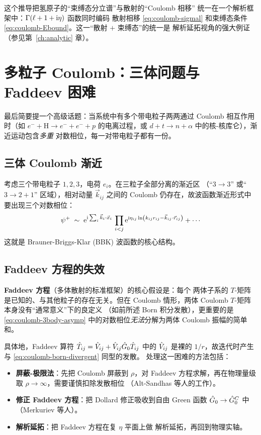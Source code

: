 \begin{remark}
这个推导把氢原子的``束缚态分立谱''与散射的``Coulomb 相移''
统一在一个解析框架中：$\Gamma(\ell+1+\mathrm{i}\eta)$ 函数同时编码
散射相移 \eqref{eq:coulomb-sigmal} 和束缚态条件
\eqref{eq:coulomb-Ebound}。这一``散射 $+$ 束缚态''的统一是
解析延拓视角的强大例证（参见第~\ref{ch:analytic} 章）。
\end{remark}

\section{多粒子 Coulomb：三体问题与 Faddeev 困难}\label{sec:coulomb-3body}

最后简要提一个高级话题：当系统中有多个带电粒子两两通过 Coulomb
相互作用时（如 $e^-+\mathrm{H}\to e^-+e^-+p$ 的电离过程，或
$d+t\to n+\alpha$ 中的核-核库仑），渐近运动包含\emph{多重}
对数相位，每一对带电粒子都有一份。

\subsection{三体 Coulomb 渐近}

考虑三个带电粒子 $1,2,3$，电荷 $e_i$。在三粒子全部分离的渐近区
（``$3\to 3$'' 或``$3\to 2+1$'' 区域），相对动量 $\vec k_{ij}$
之间的 Coulomb 仍存在，故波函数渐近形式中要出现三个对数相位：
\begin{equation}
  \psi^+\;\sim\;\rme^{\rmi\sum_i\vec k_i\cdot\vec x_i}\,
  \prod_{i<j}\rme^{\rmi\eta_{ij}\ln(k_{ij}r_{ij}-\vec k_{ij}\cdot\vec r_{ij})}+\cdots
  \label{eq:coulomb-3body-asymp}
\end{equation}
这就是 Brauner-Briggs-Klar (BBK) 波函数的核心结构。

\subsection{Faddeev 方程的失效}

\textbf{Faddeev 方程}（多体散射的标准框架）的核心假设是：每个
两体子系的 $T$-矩阵是已知的、与其他粒子的存在无关。但在 Coulomb
情形，两体 Coulomb $T$-矩阵本身没有``通常意义''下的良定义
（如前所述 Born 积分发散），更重要的是 \eqref{eq:coulomb-3body-asymp}
中的对数相位\emph{无法}分解为两体 Coulomb 振幅的简单和。

具体地，Faddeev 算符 $\hat{T}_{ij}=\hat{V}_{ij}+\hat{V}_{ij}\hat{G}_0\hat{T}_{ij}$
中的 $\hat{V}_{ij}$ 是裸的 $1/r$，故迭代时产生与 \eqref{eq:coulomb-born-divergent}
同型的发散。
处理这一困难的方法包括：

\begin{itemize}
  \item \textbf{屏蔽-极限法}：先把 Coulomb 屏蔽到 $\rho$，对 Faddeev
    方程求解，再在物理量级取 $\rho\to\infty$，需要谨慎扣除发散相位
    （Alt-Sandhas 等人的工作）。
  \item \textbf{修正 Faddeev 方程}：把 Dollard 修正吸收到自由
    Green 函数 $\hat{G}_0\to\hat{G}_0^C$ 中（Merkuriev 等人）。
  \item \textbf{解析延拓}：把 Faddeev 方程在复 $\eta$ 平面上做
    解析延拓，再回到物理实轴。
\end{itemize}

